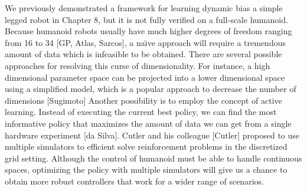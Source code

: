 We previously demonstrated a framework for learning dynamic bias
a simple legged robot in Chapter 8, but it is not fully verified on a
full-scale humanoid.
Because humanoid robots usually have much higher degrees of freedom ranging
from 16 to 34 [GP, Atlas, Sarcos], a na\"{\i}ve approach will require
a tremendous amount of data which is infeasible to be obtained.
There are several possible approaches for resolving this curse of
dimensionality.
For instance, a high dimensional parameter space can be projected into a lower
dimensional space using a simplified model, which is a popular approach to
decrease the number of dimensions [Sugimoto]
Another possibility is to employ the concept of active learning.
Instead of executing the current best policy, we can find the most
informative policy that maximizes the amount of data we can get from a
single hardware experiment [da Silva].
Cutler and his colleague [Cutler] proposed to use multiple simulators 
to efficient solve reinforcement problems in the
discretized grid setting.
Although the control of humanoid must be able to handle continuous spaces,
optimizing the policy with multiple simulators will give us a chance to obtain
more robust controllers that work for a wider range of scenarios.














